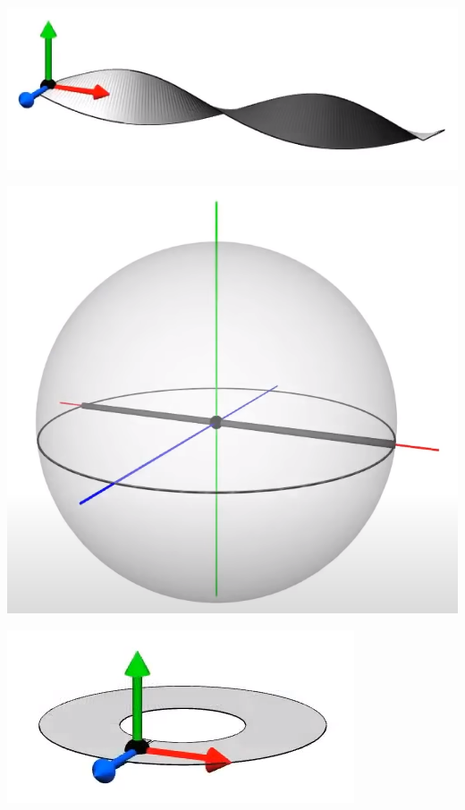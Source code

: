 \documentclass[10pt]{beamer}
\begin{document}
    \includegraphics[scale=0.1]{Pictures/xaxisbelt.png}

    \includegraphics[scale=0.1]{Pictures/xaxissphere.png}

    \includegraphics[scale=0.1]{Pictures/yaxisbelt.png}
\end{document}
